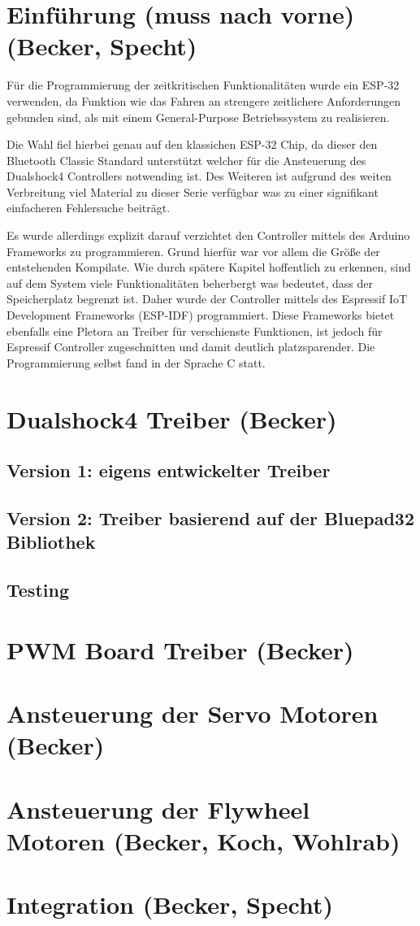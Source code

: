 \section{Einführung (muss nach vorne) (Becker, Specht)}

Für die Programmierung der zeitkritischen Funktionalitäten wurde ein ESP-32 verwenden, da Funktion wie das Fahren an strengere zeitlichere Anforderungen
gebunden sind, als mit einem General-Purpose Betriebssystem zu realisieren. 

Die Wahl fiel hierbei genau auf den klassichen ESP-32 Chip, da dieser den Bluetooth Classic Standard unterstützt welcher für die Ansteuerung des Dualshock4 Controllers notwending ist.
Des Weiteren ist aufgrund des weiten Verbreitung viel Material zu dieser Serie verfügbar was zu einer signifikant einfacheren Fehlersuche beiträgt.

Es wurde allerdings explizit darauf verzichtet den Controller mittels des Arduino Frameworks zu programmieren. Grund hierfür war vor allem die Größe
der entstehenden Kompilate. Wie durch spätere Kapitel hoffentlich zu erkennen, sind auf dem System viele Funktionalitäten beherbergt was bedeutet, dass der Speicherplatz begrenzt ist.
Daher wurde der Controller mittels des Espressif IoT Development Frameworks (ESP-IDF) programmiert. Diese Frameworks bietet ebenfalls eine Pletora an Treiber für verschienste Funktionen, ist jedoch für Espressif Controller
zugeschnitten und damit deutlich platzsparender. Die Programmierung selbst fand in der Sprache C statt.

\section{Dualshock4 Treiber (Becker)}

\subsection{Version 1: eigens entwickelter Treiber}

\subsection{Version 2: Treiber basierend auf der Bluepad32 Bibliothek}

\subsection{Testing}

\section{PWM Board Treiber (Becker)}

\section{Ansteuerung der Servo Motoren (Becker)}

\section{Ansteuerung der Flywheel Motoren (Becker, Koch, Wohlrab)}

\section{Integration (Becker, Specht)}